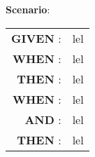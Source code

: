 \documentclass[12pt]{article}
\begin{document}
\noindent \textbf{Scenario}:
\begin{table}[!htb]
\begin{tabular}{|rl|}
\textsf{\textbf{GIVEN}} : & lel\\
\textsf{\textbf{WHEN}} : & lel\\
\textsf{\textbf{THEN}} : & lel\\
\textsf{\textbf{WHEN}} : & lel\\
\textsf{\textbf{AND}} : & lel\\
\textsf{\textbf{THEN}} : & lel
\end{tabular}
\end{table}
\end{document}
